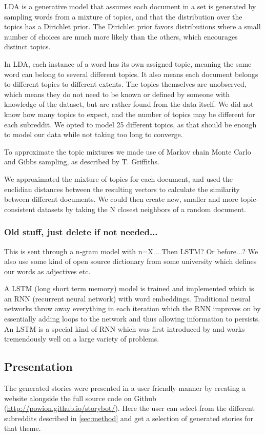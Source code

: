 \documentclass[12pt,a4paper,utf8]{article}
\begin{document}
LDA is a generative model that assumes each document in a set is generated by sampling words from a mixture of topics, and that the distribution over the topics has a Dirichlet prior. The Dirichlet prior favors distributions where a small number of choices are much more likely than the others, which encourages distinct topics.

In LDA, each instance of a word has its own assigned topic, meaning the same word can belong to several different topics. It also means each document belongs to different topics to different extents. The topics themselves are unobserved, which means they do not need to be known or defined by someone with knowledge of the dataset, but are rather found from the data itself. We did not know how many topics to expect, and the number of topics may be different for each subreddit. We opted to model 25 different topics, as that should be enough to model our data while not taking too long to converge.

To approximate the topic mixtures we made use of Markov chain Monte Carlo and Gibbs sampling, as described by T. Griffiths\cite{griffiths2002gibbs}.

We approximated the mixture of topics for each document, and used the euclidian distances between the resulting vectors to calculate the similarity between different documents. We could then create new, smaller and more topic-consistent datasets by taking the N closest neighbors of a random document. 

\subsubsection{Old stuff, just delete if not needed...}

This is sent through a n-gram model with n=X... Then LSTM? Or before...? We also use some kind of open source dictionary from some university which defines our words as adjectives etc.

A LSTM (long short term memory) model is trained and implemented which is an RNN (recurrent neural network) with word embeddings. Traditional neural networks throw away everything in each iteration which the RNN improves on by essentially adding loops to the network and thus allowing information to persists\autocite{LSTM}. An LSTM is a special kind of RNN which was first introduced by \textcite{LSTMarticle} and works tremendously well on a large variety of problems\autocite{LSTM}.

\subsection{Presentation}
The generated stories were presented in a user friendly manner by creating a website alongside the full source code on Github (\url{http://powion.github.io/storybot/}). Here the user can select from the different subreddits described in \autoref{sec:method} and get a selection of generated stories for that theme.
\end{document}
